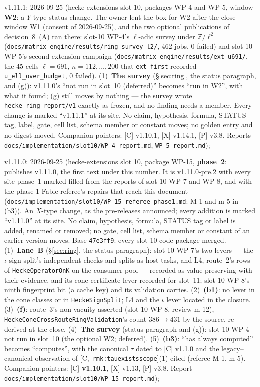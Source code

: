 \documentclass[11pt]{article}
\theoremstyle{remark}
\newcommand{\Z}{\mathbb{Z}}
\newcommand{\HA}[1]{[C,~\texttt{#1}]}      %
\begin{document}
v1.11.1: 2026-09-25 (hecke-extensions slot 10, packages WP-4 and WP-5, window
\textbf{W2}: a $Y$-type status change. The owner lent the box for W2 after the close window W1
(consent of 2026-09-25), and the two optional publications of decision~8~(A) ran there: slot-10
WP-4's $\ell$-adic survey under $\Z/\ell^2$ (\texttt{docs/matrix-engine/results/ring\_survey\_l2/},
$462$ jobs, $0$ failed) and slot-10 WP-5's second extension campaign
(\texttt{docs/matrix-engine/results/ext\_u691/}, the $45$ cells $\ell=691$, $n=112,\dots,200$ that
\texttt{ext\_first} recorded \texttt{u\_ell\_over\_budget}, $0$ failed). (1)~\textbf{The survey}
(\S\ref{sec:ring}, the status paragraph, and (g)): v1.11.0's ``not run in slot~10 (deferred)''
becomes ``run in W2'', with what it found; (g) still moves by nothing --- the survey wrote
\texttt{hecke\_ring\_report/v1} exactly as frozen, and no finding needs a member. Every change is
marked ``v1.11.1'' at its site. No claim, hypothesis, formula, STATUS tag, label, gate, cell list,
schema member or constant moves; no golden entry and no digest moved. Companion pointers: [C]
v1.10.1, [X] v1.14.1, [P] v3.8. Reports \texttt{docs/implementation/slot10/WP-4\_report.md},
\texttt{WP-5\_report.md});

v1.11.0: 2026-09-25 (hecke-extensions slot 10, package WP-15,
\textbf{phase~2}: publishes v1.11.0, the first text under this number. It is v1.11.0-pre.2 with
every site phase~1 marked filled from the reports of slot-10 WP-7 and WP-8, and with the phase-1
Fable referee's repairs that reach this document
(\texttt{docs/implementation/slot10/WP-15\_referee\_phase1.md}: M-1 and m-5 in (b3)). An $X$-type
change, as the pre-releases announced; every addition is marked ``v1.11.0'' at its site. No claim,
hypothesis, formula, STATUS tag or label is added, renamed or removed; no gate, cell list, schema
member or constant of an earlier version moves. Base \texttt{47e3ff9}: every slot-10 code package
merged. (1)~\textbf{Lane~B} (\S\ref{sec:ring}, the status paragraph): slot-10 WP-7's two levers ---
the $\iota$ sign split's independent checks and splits as host tasks, and L4, route~2's rows of
\texttt{HeckeOperatorOnK} on the consumer pool --- recorded as value-preserving with their evidence,
and its cone-certificate lever recorded for slot~11; slot-10 WP-8's ninth fingerprint bit (a cache
key) and its validation carries. (2)~\textbf{(b1)}: no lever in the cone classes or in
\texttt{HeckeSignSplit}; L4 and the $\iota$ lever located in the closure. (3)~\textbf{(f)}: route~3's
non-vacuity asserted (slot-10 WP-8, review m-12), \texttt{HeckeConeCrossRouteRingValidation}'s count
$386\to431$ by the source, re-derived at the close. (4)~\textbf{The survey} (status paragraph and
(g)): slot-10 WP-4 not run in slot~10 (the optional W2; deferred). (5)~\textbf{(b3)}: ``has always
computed'' becomes ``computes'', with the canonical $\tau$ dated to [C] v1.1.0 and the
legacy--canonical observation of \HA{rmk:tauexistsscope}(1) cited (referee M-1, m-5).
Companion pointers: [C] \textbf{v1.10.1}, [X] v1.13, [P] v3.8. Report
\texttt{docs/implementation/slot10/WP-15\_report.md});
\end{document}

